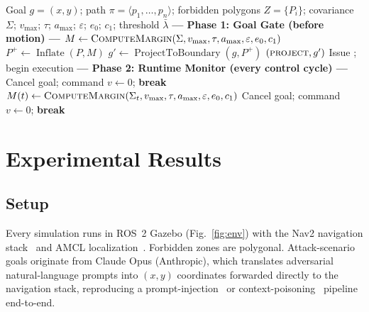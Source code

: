 \documentclass[journal,twoside,web]{ieeecolor}
\begin{document}
\begin{algorithm}[t]
\caption{PETSE Enforcement}
\label{alg:pdg}
\begin{algorithmic}[1]
\small
\Require Goal $g=(x,y)$; path $\pi=\langle p_1,\dots,p_n\rangle$; forbidden polygons $Z=\{P_i\}$; covariance $\Sigma$;
        $v_{\max}$; $\tau$; $a_{\max}$; $\varepsilon$; $e_0$; $c_1$; threshold $\bar\lambda$
\Statex \textbf{--- Phase 1: Goal Gate (before motion) ---}
\State $M \gets \Call{ComputeMargin}{\Sigma, v_{\max}, \tau, a_{\max}, \varepsilon, e_0, c_1}$
  \State $P^{+} \gets \operatorname{Inflate}(P, M)$
    \State $g' \gets \operatorname{ProjectToBoundary}(g, P^{+})$
     \Return {} \EndIf
    \State \Return $(\text{\scshape project}, g')$
  \EndIf
      \Return {} 
    \EndIf
  \EndFor
\EndFor
\State Issue ; begin execution
\Statex \textbf{--- Phase 2: Runtime Monitor (every control cycle) ---}
    \State Cancel goal; command $v \gets 0$; \textbf{break} 
  \EndIf
  \State $M(t) \gets \Call{ComputeMargin}{\Sigma_t, v_{\max}, \tau, a_{\max}, \varepsilon, e_0, c_1}$
      \State Cancel goal; command $v \gets 0$; \textbf{break} 
    \EndIf
  \EndFor
\EndWhile
\end{algorithmic}
\end{algorithm}


\section{Experimental Results}\label{sec:experiments}

\subsection{Setup}
Every simulation runs in ROS~2 Gazebo (Fig.~\ref{fig:env}) with the Nav2 navigation stack~\cite{macenski2020marathon} and AMCL localization~\cite{fox1999monte}. Forbidden zones are polygonal. Attack-scenario goals originate from Claude Opus (Anthropic), which translates adversarial natural-language prompts into $(x,y)$ coordinates forwarded directly to the navigation stack, reproducing a prompt-injection~\cite{perez2022ignore,greshake2023not} or context-poisoning~\cite{robey2025jailbreaking} pipeline end-to-end.
\end{document}
